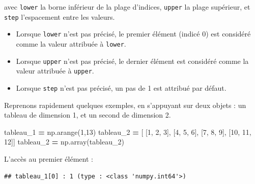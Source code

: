 \documentclass[12pt,]{book}
\newenvironment{Shaded}{\begin{snugshade}}{\end{snugshade}}
\newcommand{\DecValTok}[1]{\textcolor[rgb]{0.00,0.00,0.81}{#1}}
\newcommand{\SpecialCharTok}[1]{\textcolor[rgb]{0.00,0.00,0.00}{#1}}
\newcommand{\StringTok}[1]{\textcolor[rgb]{0.31,0.60,0.02}{#1}}
\newcommand{\OperatorTok}[1]{\textcolor[rgb]{0.81,0.36,0.00}{\textbf{#1}}}
\newcommand{\BuiltInTok}[1]{#1}
\newcommand{\NormalTok}[1]{#1}
\providecommand{\tightlist}{%
  \setlength{\itemsep}{0pt}\setlength{\parskip}{0pt}}
\numberwithin{equation}{section}
\numberwithin{countremarque}{section}
\begin{document}
avec \texttt{lower} la borne inférieur de la plage d'indices,
\texttt{upper} la plage supérieur, et \texttt{step} l'espacement entre
les valeurs.

\begin{itemize}
\tightlist
\item
  Lorsque \texttt{lower} n'est pas précisé, le premier élément (indicé
  0) est considéré comme la valeur attribuée à \texttt{lower}.
\item
  Lorsque \texttt{upper} n'est pas précisé, le dernier élément est
  considéré comme la valeur attribuée à \texttt{upper}.
\item
  Lorsque \texttt{step} n'est pas précisé, un pas de 1 est attribué par
  défaut.
\end{itemize}

Reprenons rapidement quelques exemples, en s'appuyant sur deux objets :
un tableau de dimension 1, et un second de dimension 2.

\begin{Shaded}
\begin{Highlighting}[]
\NormalTok{tableau_1 }\OperatorTok{=}\NormalTok{ np.arange(}\DecValTok{1}\NormalTok{,}\DecValTok{13}\NormalTok{)}
\NormalTok{tableau_2 }\OperatorTok{=}\NormalTok{ [ [}\DecValTok{1}\NormalTok{, }\DecValTok{2}\NormalTok{, }\DecValTok{3}\NormalTok{], [}\DecValTok{4}\NormalTok{, }\DecValTok{5}\NormalTok{, }\DecValTok{6}\NormalTok{], [}\DecValTok{7}\NormalTok{, }\DecValTok{8}\NormalTok{, }\DecValTok{9}\NormalTok{], [}\DecValTok{10}\NormalTok{, }\DecValTok{11}\NormalTok{, }\DecValTok{12}\NormalTok{]]}
\NormalTok{tableau_2 }\OperatorTok{=}\NormalTok{ np.array(tableau_2)}
\end{Highlighting}
\end{Shaded}

L'accès au premier élément :

\begin{Shaded}
\end{Shaded}

\begin{lstlisting}
## tableau_1[0] : 1 (type : <class 'numpy.int64'>)
\end{lstlisting}
\end{document}
